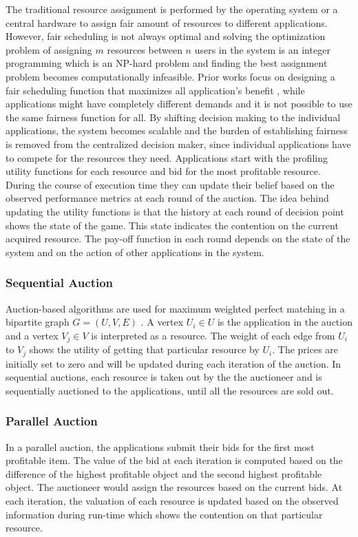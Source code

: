 \indent The traditional resource assignment is performed by the operating system or a central hardware to assign fair amount of resources to different applications. However, fair scheduling is not always optimal and solving the optimization problem of assigning $m$ resources between $n$ users in the system is an integer programming which is an NP-hard problem and finding the best assignment problem becomes computationally infeasible. Prior works focus on designing a fair scheduling function that maximizes all application's benefit \cite{zahedi2014ref, llull2017cooper, ghodsi2011dominant, zahedi2015sharing, fan2016computational}, while applications might have completely different demands and it is not possible to use the same fairness function for all. By shifting decision making to the individual applications, the system becomes scalable and the burden of establishing fairness is removed from the centralized decision maker, since individual applications have to compete for the resources they need. Applications start with the profiling utility functions for each resource and bid for the most profitable resource. During the course of execution time they can update their belief based on the observed performance metrics at each round of the auction. The idea behind updating the utility functions is that the history at each round of decision point shows the state of the game. This state indicates the contention on the current acquired resource. The pay-off function in each round depends on the state of the system and on the action of other applications in the system. 
\subsubsection{Sequential Auction}
Auction-based algorithms are used for maximum weighted perfect matching in a bipartite graph $G=(U,V, E)$ \cite{bertsekas1998network, kyle1985continuous, vasconcelos2009bipartite}. A vertex  $U_i \in U$ is the application in the auction and a vertex $V_j \in V$ is interpreted as a resource. The weight of each edge from $U_i$ to $V_j$ shows the utility of getting that particular resource by $U_i$. The prices are initially set to zero and will be updated during each iteration of the auction. In sequential auctions, each resource is taken out by the the auctioneer and is sequentially auctioned to the applications, until all the resources are sold out.
\subsubsection{Parallel Auction}
In a parallel auction, the applications submit their bids for the first most profitable item. The value of the bid at each iteration is computed based on the difference of the highest profitable object and the second highest profitable object. The auctioneer would assign the resources based on the current bids. At each iteration, the valuation of each resource is updated based on the observed information during run-time which shows the contention on that particular resource.
